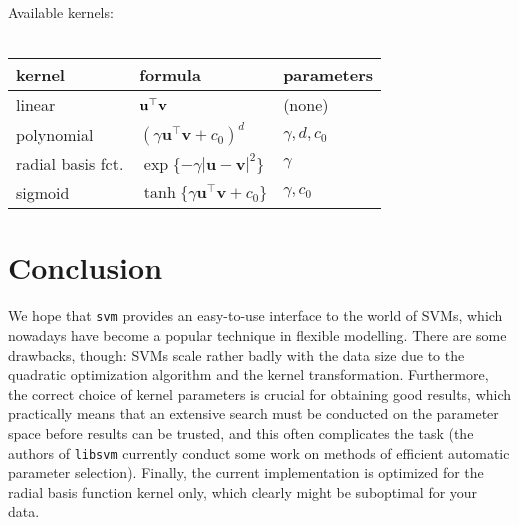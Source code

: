 \documentclass[a4paper]{article}
\begin{document}
\noindent Available kernels:\\
\\
\noindent
\begin{table}[h]
  \centering
  \begin{tabular}{|l|l|l|} \hline
    kernel            & formula & parameters \\ \hline \hline
    linear            & $\bf u^\top v$& (none) \\
    polynomial        & $(\gamma \mathbf{u^\top v}+c_0)^d$ & $\gamma, d, c_0$\\    
    radial basis fct. & $\exp\{-\gamma|\mathbf{u-v}|^2\}$&$\gamma$\\
    sigmoid           & $\tanh\{\gamma \mathbf{u^\top v}+c_0\}$ &$\gamma, c_0$\\ \hline
  \end{tabular}
\end{table}

\section*{Conclusion}

We hope that \texttt{svm} provides an easy-to-use interface to the
world of SVMs, which nowadays have become a popular technique in
flexible modelling. There are some drawbacks, though:
SVMs scale rather badly with the data size due to the quadratic
optimization algorithm and the kernel transformation. Furthermore,
the correct choice of kernel parameters is crucial for obtaining good
results, which practically means that an extensive 
search must be conducted on the parameter space before results can be
trusted, and this often complicates the task
(the authors of \texttt{libsvm} currently conduct some work on methods of efficient automatic
parameter selection). Finally, the current implementation is optimized
for the radial basis function kernel only, which clearly might be
suboptimal for your data.
\end{document}
